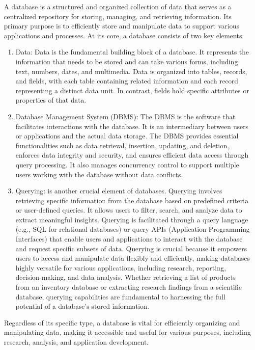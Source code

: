 A database is a structured and organized collection of data that serves as a centralized repository for storing, managing, and retrieving information. Its primary purpose is to efficiently store and manipulate data to support various applications and processes. At its core, a database consists of two key elements:

\begin{enumerate}
    \item Data: Data is the fundamental building block of a database. It represents the information that needs to be stored and can take various forms, including text, numbers, dates, and multimedia. Data is organized into tables, records, and fields, with each table containing related information and each record representing a distinct data unit. In contrast, fields hold specific attributes or properties of that data.
    \item Database Management System (DBMS): The DBMS is the software that facilitates interactions with the database. It is an intermediary between users or applications and the actual data storage. The DBMS provides essential functionalities such as data retrieval, insertion, updating, and deletion, enforces data integrity and security, and ensures efficient data access through query processing. It also manages concurrency control to support multiple users working with the database without data conflicts.
    \item Querying: is another crucial element of databases. Querying involves retrieving specific information from the database based on predefined criteria or user-defined queries. It allows users to filter, search, and analyze data to extract meaningful insights. Querying is facilitated through a query language (e.g., SQL for relational databases) or query APIs (Application Programming Interfaces) that enable users and applications to interact with the database and request specific subsets of data. Querying is crucial because it empowers users to access and manipulate data flexibly and efficiently, making databases highly versatile for various applications, including research, reporting, decision-making, and data analysis. Whether retrieving a list of products from an inventory database or extracting research findings from a scientific database, querying capabilities are fundamental to harnessing the full potential of a database's stored information.
\end{enumerate}

Regardless of its specific type, a database is vital for efficiently organizing and manipulating data, making it accessible and useful for various purposes, including research, analysis, and application development.


